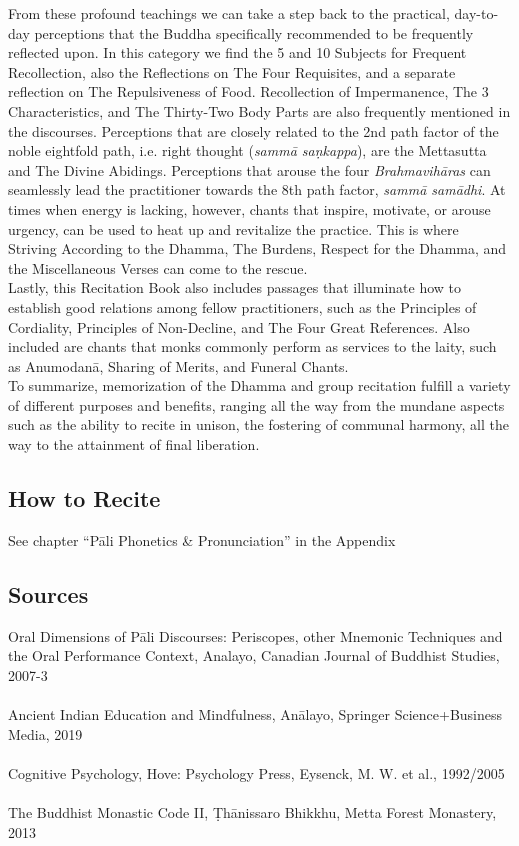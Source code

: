 From these profound teachings we can take a step back to the practical, day-to-day perceptions that the Buddha specifically recommended to be frequently reflected upon. In this category we find the 5 and 10 Subjects for Frequent Recollection, also the Reflections on The Four Requisites, and a separate reflection on The Repulsiveness of Food. Recollection of Impermanence, The 3 Characteristics, and The Thirty-Two Body Parts are also frequently mentioned in the discourses. Perceptions that are closely related to the 2nd path factor of the noble eightfold path, i.e. right thought (\textit{sammā saṇkappa}), are the Mettasutta and The Divine Abidings. Perceptions that arouse the four \textit{Brahmavihāras} can seamlessly lead the practitioner towards the 8th path factor, \textit{sammā samādhi}. At times when energy is lacking, however, chants that inspire, motivate, or arouse urgency, can be used to heat up and revitalize the practice. This is where Striving According to the Dhamma, The Burdens, Respect for the Dhamma, and the Miscellaneous Verses can come to the rescue.\\

Lastly, this Recitation Book also includes passages that illuminate how to establish good relations among fellow practitioners, such as the Principles of Cordiality, Principles of Non-Decline, and The Four Great References. Also included are chants that monks commonly perform as services to the laity, such as Anumodanā, Sharing of Merits, and Funeral Chants.\\

To summarize, memorization of the Dhamma and group recitation fulfill a variety of different purposes and benefits, ranging all the way from the mundane aspects such as the ability to recite in unison, the fostering of communal harmony, all the way to the attainment of final liberation.\\

\subsection*{How to Recite}

See chapter “Pāli Phonetics \& Pronunciation” in the Appendix\\

\subsection*{Sources}
Oral Dimensions of Pāli Discourses: Periscopes, other Mnemonic Techniques and the Oral Performance Context, Analayo, Canadian Journal of Buddhist Studies, 2007-3\\
\\
Ancient Indian Education and Mindfulness, Anālayo, Springer Science+Business Media, 2019\\
\\
Cognitive Psychology, Hove: Psychology Press, Eysenck, M. W. et al., 1992/2005\\
\\
The Buddhist Monastic Code II, Ṭhānissaro Bhikkhu, Metta Forest Monastery, 2013
